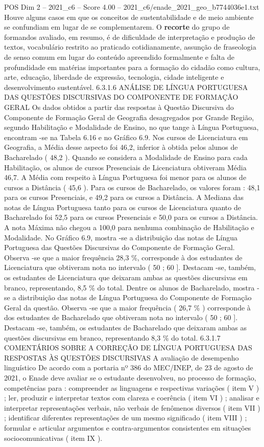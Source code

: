 \begin{textsample}{POS Dim 2 – 2021\_c6 – Score 4.00 – 2021\_c6/enade\_2021\_geo\_b7744036e1.txt}
Houve alguns casos em que os conceitos de sustentabilidade e de meio ambiente se confundiam em lugar de se complementarem.
O \textbf{recorte} do grupo de formandos avaliado, em resumo, é de dificuldade de interpretação e produção de textos, vocabulário restrito ao praticado cotidianamente, assunção de fraseologia de senso comum em lugar do conteúdo apreendido formalmente e falta de profundidade em matérias importantes para a formação do cidadão como cultura, arte, educação, liberdade de expressão, tecnologia, cidade inteligente e desenvolvimento sustentável. 6.3.1.6 ANÁLISE DE LÍNGUA PORTUGUESA DAS QUESTÕES DISCURSIVAS DO COMPONENTE DE FORMAÇÃO GERAL Os dados obtidos a partir das respostas à Questão Discursiva do Componente de Formação Geral de Geografia desagregados por Grande Região, segundo Habilitação e Modalidade de Ensino, no que tange à Língua Portuguesa, encontram -se na Tabela 6.16 e no Gráfico 6.9.
Nos cursos de Licenciatura em Geografia, a Média desse aspecto foi 46,2, inferior à obtida pelos alunos de Bacharelado ( 48,2 ).
Quando se considera a Modalidade de Ensino para cada Habilitação, os alunos de cursos Presenciais de Licenciatura obtiveram Média 46,7.
A Média com respeito à Língua Portuguesa foi menor para os alunos de cursos a Distância ( 45,6 ).
Para os cursos de Bacharelado, os valores foram : 48,1 para os cursos Presenciais, e 49,2 para os cursos a Distância.
A Mediana das notas de Língua Portuguesa tanto para os cursos de Licenciatura quanto de Bacharelado foi 52,5 para os cursos Presenciais e 50,0 para os cursos a Distância.
A nota Máxima não chegou a 100,0 para nenhuma combinação de Habilitação e Modalidade.
No Gráfico 6.9, mostra -se a distribuição das notas de Língua Portuguesa das Questões Discursivas do Componente de Formação Geral.
Observa -se que a maior frequência 28,3 \%, corresponde à dos estudantes de Licenciatura que obtiveram nota no intervalo ( 50 ; 60 ].
Destacam -se, também, os estudantes de Licenciatura que deixaram ambas as questões discursivas em branco, representando, 8,5 \% do total.
Dentre os alunos de Bacharelado, mostra -se a distribuição das notas de Língua Portuguesa do Componente de Formação Geral da questão.
Observa -se que a maior frequência ( 26,7 \% ) corresponde à dos estudantes de Bacharelado que obtiveram nota no intervalo ( 50 ; 60 ].
Destacam -se, também, os estudantes de Bacharelado que deixaram ambas as questões discursivas em branco, representando 8,3 \% do total. 6.3.1.7 COMENTÁRIOS SOBRE A CORREÇÃO DE LÍNGUA PORTUGUESA DAS RESPOSTAS ÀS QUESTÕES DISCURSIVAS A avaliação de desempenho linguístico De acordo com a portaria nº 386 do MEC/INEP, de 23 de agosto de 2021, o Enade deve avaliar se o estudante desenvolveu, no processo de formação, competências para : compreender as linguagens e respectivas variações ( item V ) ; ler, produzir e interpretar textos com clareza e coerência ( item VI ) ; analisar e interpretar representações verbais, não verbais de fenômenos diversos ( item VII ) ; identificar diferentes representações de um mesmo significado ( item VIII ) ; formular e articular argumentos e contra-argumentos consistentes em situações sociocomunicativas ( item IX ).

\end{textsample}
